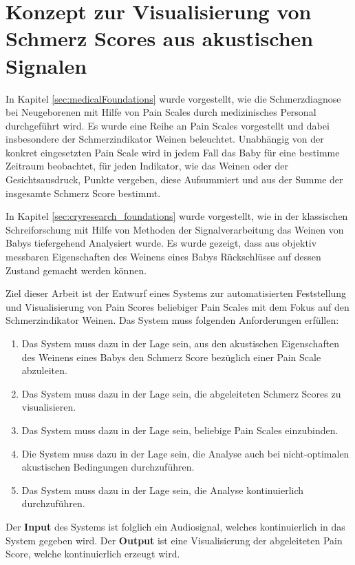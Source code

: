 \chapter{Konzept zur Visualisierung von Schmerz Scores aus akustischen Signalen}
\label{sec:concept}

In Kapitel \ref{sec:medicalFoundations} wurde vorgestellt, wie die Schmerzdiagnose bei Neugeborenen mit Hilfe von Pain Scales durch medizinisches Personal durchgeführt wird. Es wurde eine Reihe an Pain Scales vorgestellt und dabei insbesondere der Schmerzindikator \glqq Weinen\grqq{} beleuchtet. Unabhängig von der konkret eingesetzten Pain Scale wird in jedem Fall das Baby für eine bestimme Zeitraum beobachtet, für jeden Indikator, wie das Weinen oder der Gesichtsausdruck, Punkte vergeben, diese Aufsummiert und aus der Summe der insgesamte Schmerz Score bestimmt. 

In Kapitel \ref{sec:cryresearch_foundations} wurde vorgestellt, wie in der klassischen Schreiforschung mit Hilfe von Methoden der Signalverarbeitung das Weinen von Babys tiefergehend Analysiert wurde. Es wurde gezeigt, dass aus objektiv messbaren Eigenschaften des Weinens eines Babys Rückschlüsse auf dessen Zustand gemacht werden können.

Ziel dieser Arbeit ist der Entwurf eines Systems zur automatisierten Feststellung und Visualisierung von Pain Scores beliebiger Pain Scales mit dem Fokus auf den Schmerzindikator \glqq Weinen\grqq. Das System muss folgenden Anforderungen erfüllen:

\begin{enumerate}
	\item Das System muss dazu in der Lage sein, aus den akustischen Eigenschaften des Weinens eines Babys den Schmerz Score bezüglich einer Pain Scale abzuleiten.
	\item Das System muss dazu in der Lage sein, die abgeleiteten Schmerz Scores zu visualisieren.
	\item Das System muss dazu in der Lage sein, beliebige Pain Scales einzubinden. 
	\item Die System muss dazu in der Lage sein, die Analyse auch bei nicht-optimalen akustischen Bedingungen durchzuführen.
	\item Das System muss dazu in der Lage sein, die Analyse kontinuierlich durchzuführen.
\end{enumerate}

Der \textbf{Input} des Systems ist folglich ein Audiosignal, welches kontinuierlich in das System gegeben wird. Der \textbf{Output} ist eine Visualisierung der abgeleiteten Pain Score, welche kontinuierlich erzeugt wird.

